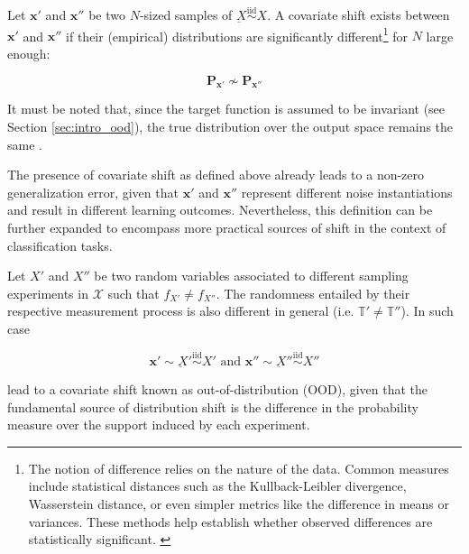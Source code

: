 \begin{definition}
    Let $\bm{x}'$ and $\bm{x}''$ be two $N$-sized samples of $\underbar{X} \overset{\text{iid}}{\sim} X$.
    A covariate shift exists between $\bm{x}'$ and $\bm{x}''$ if their
    (empirical) distributions are significantly different\footnote{
        The notion of difference relies on the nature of the data. Common measures 
        include statistical distances such as the Kullback-Leibler divergence, 
        Wasserstein distance, or even simpler metrics like the difference in 
        means or variances. These methods help establish whether observed 
        differences are statistically significant. \cite{quinonero-candelaDatasetShiftMachine2009}
    }
    for $N$ large enough:

    $$
    \mathbf{P}_{\bm{x}'} \not \sim \mathbf{P}_{\bm{x}''}
    $$
    
    It must be noted that, since the target function is assumed
    to be invariant (see Section \ref{sec:intro_ood}), 
    the true distribution over the output space
    remains the same \cite{quinonero-candelaDatasetShiftMachine2009}.
\end{definition}

The presence of covariate shift as defined above already leads
to a non-zero generalization error, given that $\bm{x}'$ and $\bm{x}''$ 
represent different noise instantiations and result in different 
learning outcomes. Nevertheless, this definition can be further
expanded to encompass more practical sources of shift in the 
context of classification tasks.

\begin{definition}\label{def:domain_shift}
    Let $X'$ and $X''$ be two random variables associated to different sampling 
    experiments in $\mathcal{X}$ such that $f_{X'} \neq f_{X''}$.
    The randomness entailed by their respective measurement process is also different
    in general (i.e. $\mathbb{T}' \neq \mathbb{T}''$). In such case

    $$
        \bm{x}' \sim \underbar{X}' \overset{\text{iid}}{\sim} X' \text{ and } \bm{x}'' \sim \underbar{X}'' \overset{\text{iid}}{\sim} X''
    $$

    lead to a covariate shift known as out-of-distribution (OOD), given that 
    the fundamental source of distribution shift is the difference in the probability
    measure over the support induced by each experiment. \cite{quinonero-candelaDatasetShiftMachine2009}
\end{definition}

